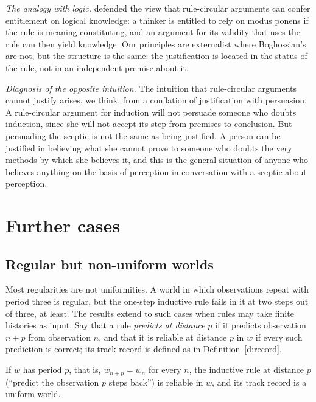 \documentclass{situationist-preprint}
\begin{document}
\emph{The analogy with logic.} \citet{Boghossian2000} defended the view that rule-circular arguments can confer entitlement on logical knowledge: a thinker is entitled to rely on modus ponens if the rule is meaning-constituting, and an argument for its validity that uses the rule can then yield knowledge. Our principles are externalist where Boghossian's are not, but the structure is the same: the justification is located in the status of the rule, not in an independent premise about it.

\emph{Diagnosis of the opposite intuition.} The intuition that rule-circular arguments cannot justify arises, we think, from a conflation of justification with persuasion. A rule-circular argument for induction will not persuade someone who doubts induction, since she will not accept its step from premises to conclusion. But persuading the sceptic is not the same as being justified. A person can be justified in believing what she cannot prove to someone who doubts the very methods by which she believes it, and this is the general situation of anyone who believes anything on the basis of perception in conversation with a sceptic about perception.

\section{Further cases}\label{s:cases}

\subsection{Regular but non-uniform worlds}

Most regularities are not uniformities. A world in which observations repeat with period three is regular, but the one-step inductive rule fails in it at two steps out of three, at least. The results extend to such cases when rules may take finite histories as input. Say that a rule \emph{predicts at distance $p$} if it predicts observation $n + p$ from observation $n$, and that it is reliable at distance $p$ in $w$ if every such prediction is correct; its track record is defined as in Definition~\ref{d:record}.

\begin{proposition}\label{p:periodic}
If $w$ has period $p$, that is, $w_{n+p} = w_n$ for every $n$, the inductive rule at distance $p$ (\enquote{predict the observation $p$ steps back}) is reliable in $w$, and its track record is a uniform world.
\end{proposition}
\end{document}
